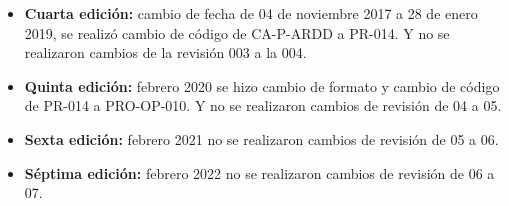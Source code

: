 \begin{itemize}
	\item \textbf{Cuarta edición:} cambio de fecha de 04 de noviembre 2017 a 28 de enero 2019, se realizó cambio de código de CA-P-ARDD a PR-014. Y no se realizaron cambios de la revisión 003 a la 004.
	\item \textbf{Quinta edición:} febrero 2020 se hizo cambio de formato y cambio de código de PR-014 a PRO-OP-010. Y no se realizaron cambios de revisión de 04 a 05.
	\item \textbf{Sexta edición:} febrero 2021 no se realizaron cambios de revisión de 05 a 06.
	\item \textbf{Séptima edición:} febrero 2022 no se realizaron cambios de revisión de 06 a 07.
\end{itemize}
